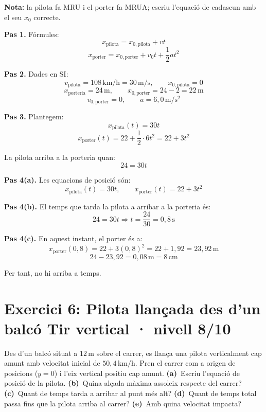 \documentclass[11pt,a4paper]{article}
\begin{document}
\textbf{Nota:} la pilota fa MRU i el porter fa MRUA; escriu l'equació de cadascun amb el seu $x_0$ correcte.

\begin{solutionbox}
\textbf{Pas 1.} Fórmules:
\[
x_{\text{pilota}}=x_{0,\text{pilota}}+vt
\]
\[
x_{\text{porter}}=x_{0,\text{porter}}+v_0t+\frac{1}{2}at^2
\]

\textbf{Pas 2.} Dades en SI:
\[
v_{\text{pilota}}=108\,\mathrm{km/h}=30\,\mathrm{m/s}, \qquad x_{0,\text{pilota}}=0
\]
\[
x_{\text{porteria}}=24\,\mathrm{m}, \qquad x_{0,\text{porter}}=24-2=22\,\mathrm{m}
\]
\[
v_{0,\text{porter}}=0, \qquad a=6{,}0\,\mathrm{m/s^2}
\]

\textbf{Pas 3.} Plantegem:
\[
x_{\text{pilota}}(t)=30t
\]
\[
x_{\text{porter}}(t)=22+\frac{1}{2}\cdot 6t^2=22+3t^2
\]

La pilota arriba a la porteria quan:
\[
24=30t
\]

\textbf{Pas 4(a).} Les equacions de posició són:
\[
x_{\text{pilota}}(t)=30t, \qquad x_{\text{porter}}(t)=22+3t^2
\]

\textbf{Pas 4(b).} El temps que tarda la pilota a arribar a la porteria és:
\[
24=30t \Longrightarrow t=\frac{24}{30}=0{,}8\,\mathrm{s}
\]

\textbf{Pas 4(c).} En aquest instant, el porter és a:
\[
x_{\text{porter}}(0{,}8)=22+3(0{,}8)^2=22+1{,}92=23{,}92\,\mathrm{m}
\]
\[
24-23{,}92=0{,}08\,\mathrm{m}=8\,\mathrm{cm}
\]

Per tant, no hi arriba a temps.
\end{solutionbox}

\clearpage

\section*{Exercici 6: Pilota llançada des d'un balcó \hfill \normalfont Tir vertical · nivell 8/10}

Des d'un balcó situat a $12\,\mathrm{m}$ sobre el carrer, es llança una pilota verticalment cap amunt amb velocitat inicial de $50{,}4\,\mathrm{km/h}$. Pren el carrer com a origen de posicions ($y=0$) i l'eix vertical positiu cap amunt. \textbf{(a)}~Escriu l'equació de posició de la pilota. \textbf{(b)}~Quina alçada màxima assoleix respecte del carrer? \textbf{(c)}~Quant de temps tarda a arribar al punt més alt? \textbf{(d)}~Quant de temps total passa fins que la pilota arriba al carrer? \textbf{(e)}~Amb quina velocitat impacta?
\end{document}
